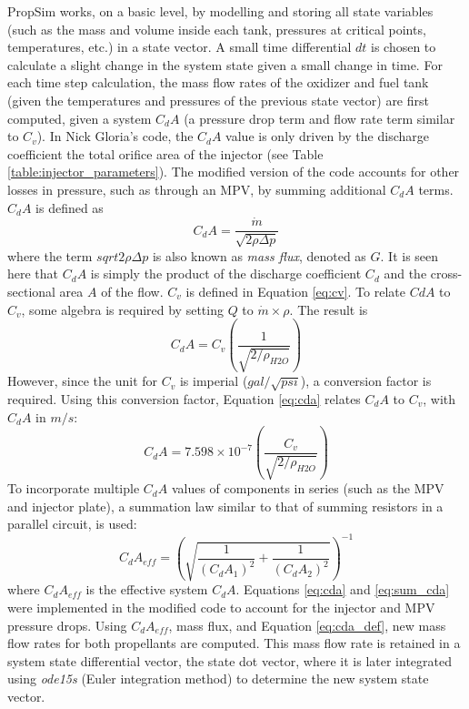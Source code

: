 \documentclass[9pt]{article} %
\numberwithin{equation}{section} %
\begin{document}
PropSim works, on a basic level, by modelling and storing all state variables (such as the mass and volume inside each tank, pressures at critical points, temperatures, etc.) in a state vector. A small time differential $dt$ is chosen to calculate a slight change in the system state given a small change in time. For each time step calculation, the mass flow rates of the oxidizer and fuel tank (given the temperatures and pressures of the previous state vector) are first computed, given a system $C_{d}A$ (a pressure drop term and flow rate term similar to $C_{v}$). In Nick Gloria's code, the $C_{d}A$ value is only driven by the discharge coefficient the total orifice area of the injector (see Table \ref{table:injector_parameters}). The modified version of the code accounts for other losses in pressure, such as through an MPV, by summing additional $C_{d}A$ terms. $C_{d}A$ is defined as
\begin{equation} \label{eq:cda_def}
C_{d}A = \frac{\dot{m}}{\sqrt{2\rho\Delta p}}
\end{equation}
where the term $sqrt{2\rho\Delta p}$ is also known as \textit{mass flux}, denoted as $G$. It is seen here that $C_{d}A$ is simply the product of the discharge coefficient $C_{d}$ and the cross-sectional area $A$ of the flow. $C_{v}$ is defined in Equation \ref{eq:cv}. To relate $CdA$ to $C_{v}$, some algebra is required by setting $Q$ to $\dot{m} \times \rho$. The result is
\begin{equation} 
C_{d}A = C_{v} \left( \frac{1}{\sqrt{2/\rho_{H2O}}} \right) 
\end{equation}
However, since the unit for $C_{v}$ is imperial ($gal/\sqrt{psi}$), a conversion factor is required. Using this conversion factor, Equation \ref{eq:cda} relates $C_{d}A$ to $C_{v}$, with $C_{d}A$ in $m/s$:
\begin{equation} \label{eq:cda}
C_{d}A = 7.598 \times 10^{-7} \left( \frac{C_{v}}{\sqrt{2/\rho_{H2O}}} \right) 
\end{equation}
To incorporate multiple $C_{d}A$ values of components in series (such as the MPV and injector plate), a summation law similar to that of summing resistors in a parallel circuit, is used:
\begin{equation} \label{eq:sum_cda}
C_{d}A_{eff} = \left( \sqrt{\frac{1}{(C_{d}A_{1})^{2}}+\frac{1}{(C_{d}A_{2})^{2}}} \right)^{-1}
\end{equation}
where $C_{d}A_{eff}$ is the effective system $C_{d}A$. Equations \ref{eq:cda} and \ref{eq:sum_cda} were implemented in the modified code to account for the injector and MPV pressure drops. Using $C_{d}A_{eff}$, mass flux, and Equation \ref{eq:cda_def}, new mass flow rates for both propellants are computed. This mass flow rate is retained in a system state differential vector, the state dot vector, where it is later integrated using \textit{ode15s} (Euler integration method) to determine the new system state vector.
\end{document}
